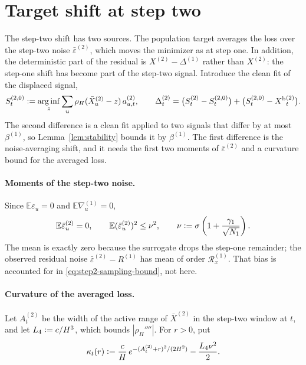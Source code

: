 \documentclass[11pt]{article}
\newcommand{\E}{\mathbb{E}}
\newcommand{\eqdef}{\mathrel{\vcentcolon=}}
\newcommand{\arginf}{\mathop{\mathrm{arg\,inf}}}
\newcommand{\Signal}{X}
\newcommand{\IMFs}{S}
\newcommand{\BiasedSignal}{X^{\mathrm b}}
\theoremstyle{definition}
\begin{document}
\section{Target shift at step two}\label{sec:shift}

The step-two shift has two sources.  The population target averages the
loss over the step-two noise \(\bar\varepsilon^{(2)}\), which moves the
minimizer as at step one.  In addition, the deterministic part of the
residual is \(\Signal^{(2)}-\Delta^{(1)}\) rather than \(\Signal^{(2)}\):
the step-one shift has become part of the step-two signal.  Introduce the
clean fit of the displaced signal,
\begin{equation}
  \IMFs^{(2,0)}_t\eqdef\arginf_z\sum_u\rho_H(\bar\Signal^{(2)}_u-z)\,a^{(2)}_{u,t},
  \qquad
  \Delta^{(2)}_t
  =\bigl(\IMFs^{(2)}_t-\IMFs^{(2,0)}_t\bigr)
   +\bigl(\IMFs^{(2,0)}_t-\BiasedSignal{}^{(2)}_t\bigr).
  \label{eq:shift-split}
\end{equation}
The second difference is a clean fit applied to two signals that differ by
at most \(\beta^{(1)}\), so Lemma~\ref{lem:stability} bounds it by
\(\beta^{(1)}\).  The first difference is the noise-averaging shift, and it
needs the first two moments of \(\bar\varepsilon^{(2)}\) and a curvature
bound for the averaged loss.

\paragraph{Moments of the step-two noise.}
Since \(\E\varepsilon_u=0\) and \(\E\nabla^{(1)}_u=0\),
\begin{equation}
  \E\bar\varepsilon^{(2)}_u=0,
  \qquad
  \E(\bar\varepsilon^{(2)}_u)^2\leq\nu^2,
  \qquad
  \nu\eqdef\sigma\left(1+\frac{\gamma_1}{\sqrt{N_1}}\right).
  \label{eq:step2-moments}
\end{equation}
The mean is exactly zero because the surrogate drops the step-one
remainder; the observed residual noise \(\bar\varepsilon^{(2)}-R^{(1)}\)
has mean of order \(\mathcal R^{(1)}_x\).  That bias is accounted for in
\eqref{eq:step2-sampling-bound}, not here.

\paragraph{Curvature of the averaged loss.}
Let \(A^{(2)}_t\) be the width of the active range of \(\bar\Signal^{(2)}\)
in the step-two window at \(t\), and let \(L_4\eqdef c/H^3\), which bounds
\(|\rho_H''''|\).  For \(r>0\), put
\begin{equation}
  \kappa_t(r)\eqdef\frac cH\,e^{-(A^{(2)}_t+r)^2/(2H^2)}-\frac{L_4\nu^2}{2}.
  \label{eq:kappa2}
\end{equation}
\end{document}
